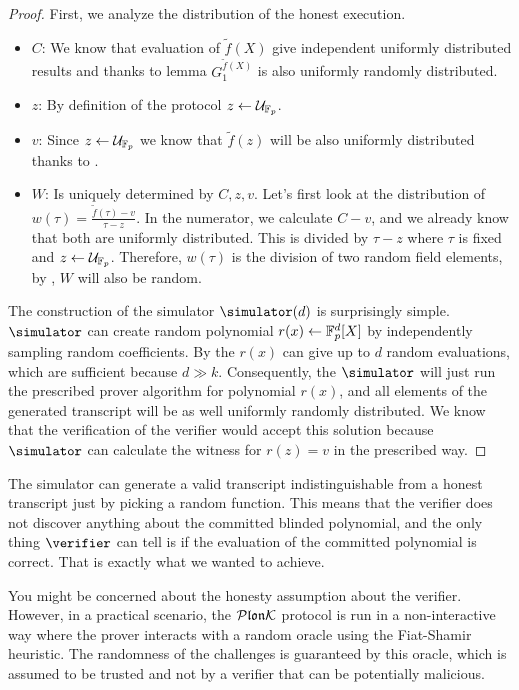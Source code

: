 \begin{proof}
    First, we analyze the distribution of the honest execution. 
    \begin{itemize}
        \item $C$: We know that evaluation of $\widetilde{f}(X)$ give independent uniformly distributed results and thanks to lemma  $G_1^{\widetilde{f}(X)}$ is also uniformly randomly distributed.
        \item $z$: By definition of the protocol $z \gets \mathcal{U}_{\mathbb{F}_p}$.
        \item $v$: Since $z \gets \mathcal{U}_{\mathbb{F}_p}$ we know that $\widetilde{f}(z)$ will be also uniformly distributed thanks to .
        \item $W$: Is uniquely determined by $C, z, v$. Let's first look at the distribution of $w(\tau) = \frac{\widetilde{f}(\tau) - v}{\tau - z}$. In the numerator, we calculate $C - v$, and we already know that both are uniformly distributed. This is divided by $\tau - z$ where $\tau$ is fixed and $z \gets \mathcal{U}_{\mathbb{F}_p}$. Therefore, $w(\tau)$ is the division of two random field elements, by , $W$ will also be random. 
    \end{itemize}

    The construction of the simulator $\simulator(d)$ is surprisingly simple. $\simulator$ can create random polynomial $r(x) \gets \mathbb{F}_p^d[X]$ by independently sampling random coefficients. By the  $r(x)$ can give up to $d$ random evaluations, which are sufficient because $d \gg k$. Consequently, the $\simulator$ will just run the prescribed prover algorithm for polynomial $r(x)$, and all elements of the generated transcript will be as well uniformly randomly distributed. We know that the verification of the verifier would accept this solution because $\simulator$ can calculate the witness for $r(z) = v$ in the prescribed way.
\end{proof}

The simulator can generate a valid transcript indistinguishable from a honest transcript just by picking a random function. This means that the verifier does not discover anything about the committed blinded polynomial, and the only thing $\verifier$ can tell is if the evaluation of the committed polynomial is correct. That is exactly what we wanted to achieve.

You might be concerned about the honesty assumption about the verifier. However, in a practical scenario, the $\mathcal{P}\mathfrak{lon}\mathcal{K}$ protocol is run in a non-interactive way where the prover interacts with a random oracle using the Fiat-Shamir heuristic. The randomness of the challenges is guaranteed by this oracle, which is assumed to be trusted and not by a verifier that can be potentially malicious.

